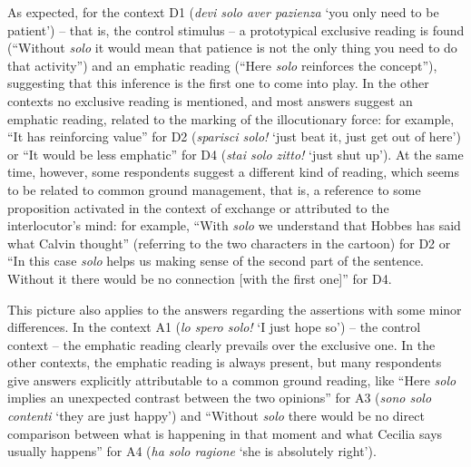 As expected, for the context D1 (\textit{devi solo aver pazienza} ‘you only need to be patient’) – that is, the control stimulus – a prototypical exclusive reading is found (“Without \textit{solo} it would mean that patience is not the only thing you need to do that activity”) and an emphatic reading (“Here \textit{solo} reinforces the concept”), suggesting that this inference is the first one to come into play. In the other contexts no exclusive reading is mentioned, and most answers suggest an emphatic reading, related to the marking of the illocutionary force: for example, “It has reinforcing value” for D2 (\textit{sparisci solo!} ‘just beat it, just get out of here’) or “It would be less emphatic” for D4 (\textit{stai solo zitto!} ‘just shut up’). At the same time, however, some respondents suggest a different kind of reading, which seems to be related to common ground management, that is, a reference to some proposition activated in the context of exchange or attributed to the interlocutor’s mind: for example, “With \textit{solo} we understand that Hobbes has said what Calvin thought” (referring to the two characters in the cartoon) for D2 or “In this case \textit{solo} helps us making sense of the second part of the sentence. Without it there would be no connection [with the first one]” for D4.

This picture also applies to the answers regarding the assertions with some minor differences. In the context A1 (\textit{lo spero solo!} ‘I just hope so’) – the control context – the emphatic reading clearly prevails over the exclusive one. In the other contexts, the emphatic reading is always present, but many respondents give answers explicitly attributable to a common ground reading, like “Here \textit{solo} implies an unexpected contrast between the two opinions” for A3 (\textit{sono solo contenti} ‘they are just happy’) and “Without \textit{solo} there would be no direct comparison between what is happening in that moment and what Cecilia says usually happens” for A4 (\textit{ha solo ragione} ‘she is absolutely right’).

